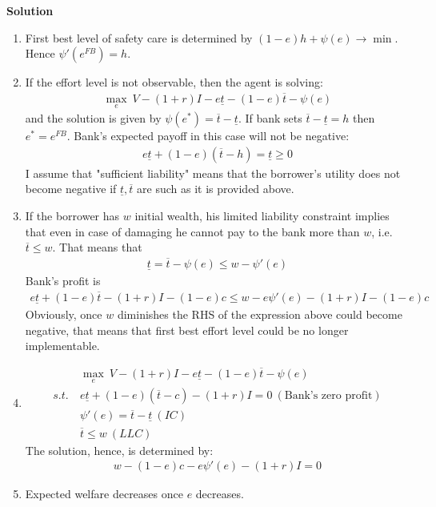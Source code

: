 \documentclass[a4paper]{article}
\newcommand{\ubar}{\overline}
\newcommand{\lbar}{\underline}
\begin{document}
\textbf{Solution}

\begin{enumerate}
	\item First best level of safety care is determined by $(1 - e)h + \psi(e) \to \min$. Hence $\psi'(e^{FB}) = h$.
	\item If the effort level is not observable, then the agent is solving:
	\begin{align*}
	\underset{e}{\max}\ V - (1+r)I - e \lbar{t} - (1 - e)\ubar{t} - \psi(e)
	\end{align*}
	and the solution is given by $\psi(e^*) = \ubar{t} - \lbar{t}$. If bank sets $\ubar{t} - \lbar{t} = h$ then $e^* = e^{FB}$. Bank's expected payoff in this case will not be negative:
	\begin{align*}
	e \lbar{t} + (1 - e) (\ubar{t} - h) = \lbar{t} \ge 0
	\end{align*}
	I assume that "sufficient liability" means that the borrower's utility does not become negative if $\lbar{t}, \ubar{t}$ are such as it is provided above.
	\item If the borrower has $w$ initial wealth, his limited liability constraint implies that even in case of damaging he cannot pay to the bank more than $w$, i.e. $\ubar{t} \le w$. That means that
	\begin{align*}
	\lbar{t} = \ubar{t} - \psi(e) \le w - \psi'(e)
	\end{align*}
	Bank's profit is
	\begin{align*}
	e \lbar{t} + (1 - e) \ubar{t} - (1 + r)I - (1 - e)c \le w - e \psi'(e)- (1 + r)I - (1 - e)c
	\end{align*}
	Obviously, once $w$ diminishes the RHS of the expression above could become negative, that means that first best effort level could be no longer implementable.
	\item \begin{align*}
	&\underset{e}{\max}\ V - (1 + r)I - e \lbar{t} - (1 - e) \ubar{t} - \psi(e)\\
	s.t.\ &e \lbar{t} + (1 - e) (\ubar{t} - c) - (1 + r)I = 0\ (\text{Bank's zero profit})\\
	&\psi'(e) = \ubar{t} - \lbar{t}\ (IC)\\
	&\ubar{t} \le w\ (LLC)
	\end{align*}
	The solution, hence, is determined by:
	\begin{align*}
	w - (1 - e)c - e \psi'(e) - (1 + r)I = 0
	\end{align*}
	\item Expected welfare decreases once $e$ decreases.

\end{enumerate}
\end{document}
